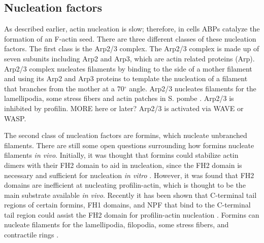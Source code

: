 \subsection{Nucleation factors}\label{nucleators}
As described earlier, actin nucleation is slow; therefore, in cells ABPs catalyze the formation of an F-actin seed. There are three different classes of these nucleation factors. The first class is the Arp2/3 complex. The Arp2/3 complex is made up of seven subunits including Arp2 and Arp3, which are actin related proteins (Arp). Arp2/3 complex nucleates filaments by binding to the side of a mother filament and using its Arp2 and Arp3 proteins to template the nucleation of a filament that branches from the mother at a 70$^{\circ}$ angle. Arp2/3 nucleates filaments for the lamellipodia, some stress fibers and actin patches in S. pombe \citep{pollard_actin_2016,naumanen_mechanisms_2008,mishra_yeast_2014}. Arp2/3 is inhibited by profilin. MORE here or later? Arp2/3 is activated via WAVE or WASP.

The second class of nucleation factors are formins, which nucleate unbranched filaments. There are still some open questions surrounding how formins nucleate filaments \textit{in vivo}. Initially, it was thought that formins could stabilize actin dimers with their FH2 domain to aid in nucleation, since the FH2 domain is necessary and sufficient for nucleation \textit{in vitro} \citep{zigmond_formin-induced_2004,paul_role_2008,pring_mechanism_2002}. However, it was found that FH2 domains are inefficient at nucleating profilin-actin, which is thought to be the main substrate available \textit{in vivo}. Recently it has been shown that C-terminal tail regions of certain formins, FH1 domains, and NPF that bind to the C-terminal tail region could assist the FH2 domain for profilin-actin nucleation \citep{breitsprecher_formins_2013}. Formins can nucleate filaments for the lamellipodia, filopodia, some stress fibers, and contractile rings \citep{faix_filopodia:_2009,mishra_yeast_2014,blanchoin_actin_2014}.

